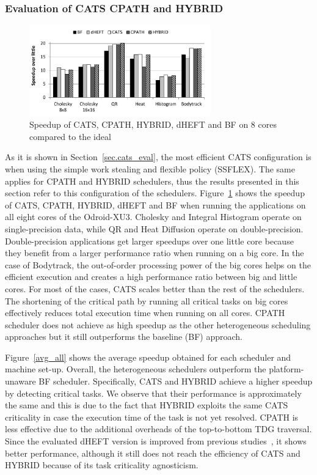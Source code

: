 \subsubsection{Evaluation of CATS CPATH and HYBRID}
\begin{figure}[!t]
	\centering
	\includegraphics[width=0.7\textwidth]{images/8cores.pdf}
	\caption{Speedup of CATS, CPATH, HYBRID, dHEFT and BF on 8 cores compared to the ideal}
	\label{BFLinear}
	\vspace{-0.4cm}
\end{figure}
As it is shown in Section~\ref{sec.cats_eval}, the most efficient CATS configuration is when using the simple work stealing and flexible policy (SSFLEX).
The same applies for CPATH and HYBRID schedulers, thus the results presented in this section refer to this configuration of the schedulers. 
Figure~\ref{BFLinear} shows the speedup of CATS, CPATH, HYBRID, dHEFT and BF when running the applications on all eight cores of the Odroid-XU3. Cholesky and Integral Histogram operate on single-precision data, while QR and Heat Diffusion operate on double-precision. 
Double-precision applications get larger speedups over one little core because they benefit from a larger performance ratio when running on a big core. In the case of Bodytrack, the out-of-order processing power of the big cores helps on the efficient execution and creates a high performance ratio between big and little cores. 
For most of the cases, CATS scales better than the rest of the schedulers. 
The shortening of the critical path by running all critical tasks on big cores effectively reduces total execution time when running on all cores. 
CPATH scheduler does not achieve as high speedup as the other heterogeneous scheduling approaches but it still outperforms the baseline (BF) approach.

Figure~\ref{avg_all} shows the average speedup obtained for each scheduler and machine set-up. 
Overall, the heterogeneous schedulers outperform the platform-unaware BF scheduler.
Specifically, CATS and HYBRID achieve a higher speedup by detecting critical tasks.
We observe that their performance is approximately the same and this is due to the fact that HYBRID exploits the same CATS criticality in case the execution time of the task is not yet resolved.
CPATH is less effective due to the additional overheads of the top-to-bottom TDG traversal.
Since the evaluated dHEFT version is improved from previous studies~\cite{Chronaki:ICS2015}, it shows better performance, although it still does not reach the efficiency of CATS and HYBRID because of its task criticality agnosticism.

